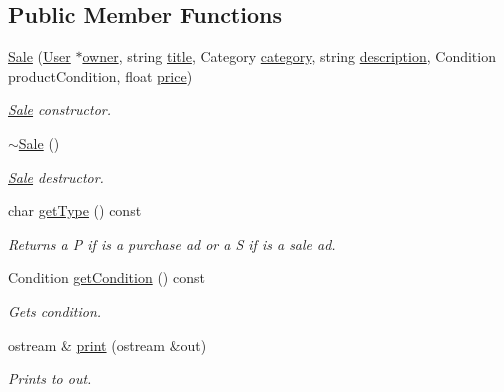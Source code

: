 \subsection*{Public Member Functions}
\begin{DoxyCompactItemize}
\item 
\hyperlink{class_sale_ac8ff8ff1ab16deb6f12f1b3e63fcb310}{Sale} (\hyperlink{class_user}{User} $\ast$\hyperlink{class_advertisement_a10398131c5aadcd1fdf08d6acabec45f}{owner}, string \hyperlink{class_advertisement_a63b197da6f91139ed6baf700f834a3db}{title}, Category \hyperlink{class_advertisement_af77599e289974c0e4f502db621257fe5}{category}, string \hyperlink{class_advertisement_afb0909f9fceabb44804e06e721ff7fee}{description}, Condition product\+Condition, float \hyperlink{class_advertisement_aefd1dddaabd0cfa411e6cbaaf67c4dd5}{price})
\begin{DoxyCompactList}\small\item\em \hyperlink{class_sale}{Sale} constructor. \end{DoxyCompactList}\item 
\hypertarget{class_sale_ab6cb58a5d618fc4e4988b55342f21b21}{}\hyperlink{class_sale_ab6cb58a5d618fc4e4988b55342f21b21}{$\sim$\+Sale} ()\label{class_sale_ab6cb58a5d618fc4e4988b55342f21b21}

\begin{DoxyCompactList}\small\item\em \hyperlink{class_sale}{Sale} destructor. \end{DoxyCompactList}\item 
char \hyperlink{class_sale_ae105e16c4b41870d375c5b1442dc7031}{get\+Type} () const 
\begin{DoxyCompactList}\small\item\em Returns a P if is a purchase ad or a S if is a sale ad. \end{DoxyCompactList}\item 
Condition \hyperlink{class_sale_a5c65f4917d237370ab578307a124342f}{get\+Condition} () const 
\begin{DoxyCompactList}\small\item\em Gets condition. \end{DoxyCompactList}\item 
ostream \& \hyperlink{class_sale_a0b9e2e6bcc648d2471dc561a7eb3dcb4}{print} (ostream \&out)
\begin{DoxyCompactList}\small\item\em Prints to out. \end{DoxyCompactList}\end{DoxyCompactItemize}
